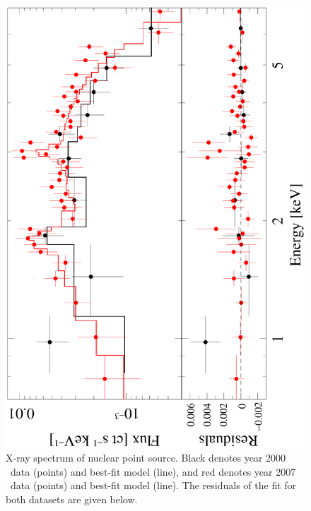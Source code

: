 \begin{figure}
  \begin{center}
    \begin{minipage}{0.5\linewidth}
      \includegraphics*[width=\textwidth, angle=-90]{nucspec.ps}
    \end{minipage}
    \caption{X-ray spectrum of nuclear point source. Black denotes
      year 2000 \cxo\ data (points) and best-fit model (line), and red
      denotes year 2007 \cxo\ data (points) and best-fit model (line).
      The residuals of the fit for both datasets are given below.}
    \label{fig:nucspec}
  \end{center}
\end{figure}

